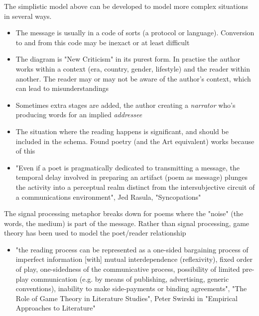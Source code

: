 \documentclass[11pt]{article}
\begin{document}
 The simplistic model above can be developed to model more complex situations in several ways. 
\begin{itemize}

\item The message is usually in a code of sorts (a protocol or language).
Conversion to and from this code may be inexact or at least difficult 
\item The diagram is "New Criticism" in its purest form. In practise the
author works within a context (era, country, gender, lifestyle) and
the reader within another. The reader may or may not be aware of the
author's context, which can lead to misunderstandings 
\item Sometimes
extra stages are added, the author creating a \textit{narrator} who's
producing words for an implied \textit{addressee} 
\item The situation where
the reading happens is significant, and should be included in the schema. Found poetry (and the Art equivalent) works because of this

\item "Even if a poet is pragmatically                                                                  
dedicated to transmitting a message, the temporal delay involved in                                   
preparing an artifact (poem as message) plunges the activity into a                                   
perceptual realm distinct from the intersubjective circuit of a                                       
communications environment", Jed Rasula, "Syncopations"
\end{itemize}


The signal processing metaphor breaks down for poems where the "noise" (the words, the medium) is part of the message. Rather than signal processing, game theory has been used to model the poet/reader relationship
\begin{itemize}
\item  "the reading process can be                                                                      
represented as a one-sided bargaining process of imperfect information [with]                         
mutual interdependence (reflexivity), fixed order of play, one-sidedness of                           
the communicative process, possibility of limited pre-play communication                              
(e.g. by means of publishing, advertising, generic conventions), inability                            
to make side-payments or binding agreements", "The Role of Game Theory in                             
Literature Studies", Peter Swirski in "Empirical Approaches to Literature" 
\end{itemize}
\end{document}
